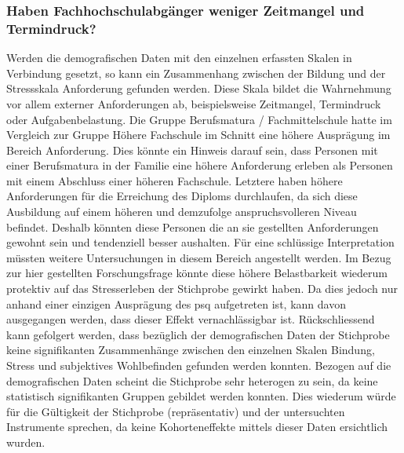 \subsubsection{Haben Fachhochschulabgänger weniger Zeitmangel und Termindruck?}
Werden die demografischen Daten mit den einzelnen erfassten Skalen in Verbindung gesetzt, so kann ein Zusammenhang zwischen der Bildung und der Stressskala Anforderung gefunden werden. Diese Skala bildet die Wahrnehmung vor allem externer Anforderungen ab, beispielsweise Zeitmangel, Termindruck oder Aufgabenbelastung. Die Gruppe Berufsmatura / Fachmittelschule hatte im Vergleich zur Gruppe Höhere Fachschule im Schnitt eine höhere Ausprägung im Bereich Anforderung. Dies könnte ein Hinweis darauf sein, dass Personen mit einer Berufsmatura in der Familie eine höhere Anforderung erleben als Personen mit einem Abschluss einer höheren Fachschule. Letztere haben höhere Anforderungen für die Erreichung des Diploms durchlaufen, da sich diese  Ausbildung auf einem höheren und demzufolge anspruchsvolleren Niveau befindet. Deshalb könnten diese Personen die an sie gestellten Anforderungen gewohnt sein und tendenziell besser aushalten. Für eine schlüssige Interpretation müssten weitere Untersuchungen in diesem Bereich angestellt werden. Im Bezug zur hier gestellten Forschungsfrage könnte diese höhere Belastbarkeit wiederum protektiv auf das Stresserleben der Stichprobe gewirkt haben. Da dies jedoch nur anhand einer einzigen Ausprägung des \acrshort{psq} aufgetreten ist, kann davon ausgegangen werden, dass dieser Effekt vernachlässigbar ist. Rückschliessend kann gefolgert werden, dass bezüglich der demografischen Daten der Stichprobe keine signifikanten Zusammenhänge zwischen den einzelnen Skalen Bindung, Stress und subjektives Wohlbefinden gefunden werden konnten. Bezogen auf die demografischen Daten scheint die Stichprobe sehr heterogen zu sein, da keine statistisch signifikanten Gruppen gebildet werden konnten. Dies wiederum würde für die Gültigkeit der Stichprobe (repräsentativ) und der untersuchten Instrumente sprechen, da keine Kohorteneffekte mittels dieser Daten ersichtlich wurden.

